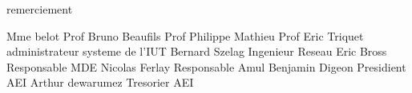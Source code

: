 remerciement



Mme belot Prof
Bruno Beaufils Prof
Philippe Mathieu Prof
Eric Triquet  administrateur systeme de l'IUT
Bernard Szelag Ingenieur Reseau
Eric Bross Responsable MDE
Nicolas Ferlay Responsable Amul
Benjamin Digeon Presidient AEI
Arthur dewarumez Tresorier AEI
